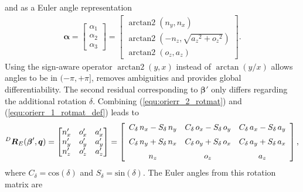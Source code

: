 \documentclass[robotics,article,accept,moreauthors,pdftex]{Definitions/mdpi}
\newcommand{\bm}[1]{\boldsymbol{#1}}
\DeclareMathOperator{\arctantwo}{arctan2}
\newcommand{\rotmat}[2]{{{ }^{#1}\boldsymbol{R}}_{#2}}
\begin{document}
%
and as a Euler angle representation
%
\begin{align}
    \bm{\alpha}
    =
    \begin{bmatrix}
    \alpha_1 \\
    \alpha_2 \\
    \alpha_3
    \end{bmatrix}
    =
    \begin{bmatrix}
        \arctantwo \left( {n_y} , { n_x} \right) \\ 
        \arctantwo \left( -{n_z} , \sqrt {{{a_z}}^{2}+{{ o_z}}^{2}} \right) \\ 
        \arctantwo \left( {o_z} , {a_z} \right)
    \end{bmatrix}.
    \label{equ:alpha_zyx}
\end{align}
%
Using the sign-aware operator $\arctantwo(y,x)$ instead of $\arctan(y/x)$ allows angles to be in $(-\pi,+\pi]$, removes ambiguities and provides global differentiability.
The second residual corresponding to $\bm{\beta}'$ only differs regarding the additional rotation $\delta$. Combining (\ref{equ:orierr_2_rotmat}) and (\ref{equ:orierr_1_rotmat_def}) leads to
%
\begin{align}
    \rotmat{D}{E}(\bm{\beta}',\bm{q})
    =
    \begin{bmatrix}
    {n'_x}&{o'_x}&{a'_x} \\
    {n'_y}&{o'_y}&{a'_y} \\ 
    {n'_z}&{o'_z}&{a'_z} \\ 
    \end{bmatrix}
    = 
    \left[ \begin {array}{ccc} { C_{\delta}}\,{n_x}-{ S_{\delta}}\,{ n_y}&{ C_{\delta}}\,{o_x}-{ S_{\delta}}\,{o_y}&{ C_{\delta}}\,{ a_x}-{ S_{\delta}}\,{a_y}\\ \noalign{\medskip}{ C_{\delta}}\,{n_y}+ { S_{\delta}}\,{n_x}&{ C_{\delta}}\,{o_y}+{ S_{\delta}}\,{o_x}&{ C_{\delta}}\,{a_y}+{ S_{\delta}}\,{a_x}\\ \noalign{\medskip}{ n_z}&{o_z}&{a_z}\end {array} \right], \nonumber
\end{align}
%
where $C_{\delta}=\mathrm{cos}(\delta)$ and $S_{\delta}=\mathrm{sin}(\delta)$.
The Euler angles from this rotation matrix are
%
\end{document}

